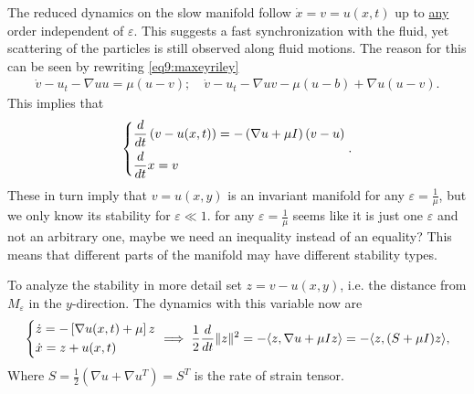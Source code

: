 \begin{ex}
The reduced dynamics on the slow manifold follow $\dot{x}=v=u(x,t)$ up to \underline{any} order independent of $\varepsilon$. This suggests a fast synchronization with the fluid, yet scattering of the particles is still observed along fluid motions. The reason for this can be seen by rewriting \eqref{eq9:maxeyriley}
\begin{align}
	\dot{v} - u_{t} - \nabla u u = \mu (u-v);\quad \dot{v} - u_{t} - \nabla u v - \mu (u-b) + \nabla u(u-v).
\end{align}
This implies that
\begin{align}
	\begin{dcases}
		\frac{d}{dt}\left(v - u(x,t)\right) = - \left( \nabla u + \mu I \right) \left( v - u \right) \\
		\frac{d}{dt} x = v
	\end{dcases}
	.
\end{align}
These in turn imply that $v=u(x,y)$ is an invariant manifold for any $\varepsilon = \frac{1}{\mu }$, but we only know its stability for $\varepsilon \ll 1$. 
{\color{blue} for any $\varepsilon = \frac{1}{\mu }$ seems like it is just one $\varepsilon$ and not an arbitrary one, maybe we need an inequality instead of an equality?}
This means that different parts of the manifold may have different stability types. 

To analyze the stability in more detail set $z= v- u(x,y)$, i.e. the distance from $ M_{\varepsilon} $ in the $y$-direction. The dynamics with this variable now are
\begin{align}
	\begin{dcases}
		\dot{z} = - \left[ \nabla u(x,t) + \mu \right] z \\
		\dot{x} = z + u(x,t)
	\end{dcases}
	\implies \frac{1}{2}\frac{d}{dt}\|z\|^{2} = - \langle z, \nabla u + \mu I z \rangle = - \langle z, (S + \mu I) z \rangle,
\end{align}
Where $S = \frac{1}{2} \left( \nabla u + \nabla u^{T} \right) = S^{T}$ is the rate of strain tensor.


\end{ex}
